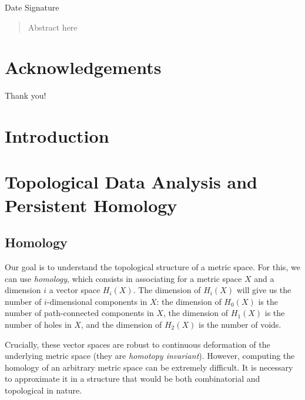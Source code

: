 \documentclass[a4paper,11pt,openany,extrafontsizes]{memoir}
\begin{document}
\begin{center}
  Date \hspace{.5\linewidth} Signature
\end{center}


\cleardoublepage%

\begin{abstract}
  Abstract here
\end{abstract}

\cleardoublepage%

\chapter*{Acknowledgements}%
\label{cha:acknowledgements}

Thank you!

\cleardoublepage%

\tableofcontents*
\listoffigures*
\listoftables*

\clearpage

\mainmatter%

\chapter{Introduction}%
\label{cha:introduction}



\chapter{Topological Data Analysis and Persistent Homology}%
\label{cha:tda-ph}

\section{Homology}%
\label{sec:homology}

Our goal is to understand the topological structure of a metric
space. For this, we can use \emph{homology}, which consists in
associating for a metric space $X$ and a dimension $i$ a vector space
$H_i(X)$. The dimension of $H_i(X)$ will give us the number of
$i$-dimensional components in $X$: the dimension of $H_0(X)$ is the
number of path-connected components in $X$, the dimension of $H_1(X)$
is the number of holes in $X$, and the dimension of $H_2(X)$ is the
number of voids.

Crucially, these vector spaces are robust to continuous deformation of
the underlying metric space (they are \emph{homotopy
  invariant}). However, computing the homology of an arbitrary metric
space can be extremely difficult. It is necessary to approximate it in
a structure that would be both combinatorial and topological in
nature.
\end{document}
